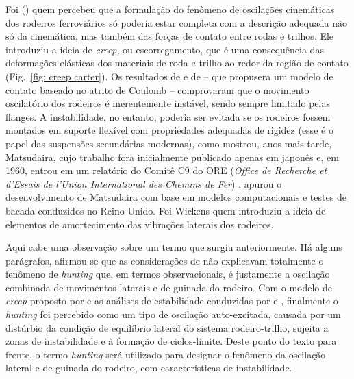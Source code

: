 Foi \citeauthor{carter_electric_1916} (\citeyear{carter_electric_1916,carter_action_1926}) quem percebeu que a formulação do fenômeno de 
oscilações cinemáticas dos rodeiros ferroviários só poderia
estar completa com a descrição adequada não só da cinemática, mas também das forças de contato entre rodas e trilhos. Ele introduziu a ideia de 
\textit{creep}, ou escorregamento, que é uma consequência das deformações elásticas dos materiais de roda e trilho ao redor da região de 
contato (Fig.~\ref{fig: creep carter}). 
Os resultados de \citeauthor{carter_electric_1916} e de  -- que propusera um modelo
de contato baseado no atrito de Coulomb -- comprovaram que o movimento oscilatório dos rodeiros é inerentemente instável, sendo sempre limitado pelas flanges.
A instabilidade, no entanto, poderia ser evitada se os rodeiros fossem montados em suporte flexível com propriedades adequadas de rigidez (esse é
o papel das suspensões secundárias modernas), como mostrou, anos mais tarde, Matsudaira, cujo trabalho fora inicialmente publicado apenas em japonês
e, em 1960, entrou em um relatório do Comitê C9 do ORE (\textit{Office de Recherche et d'Essais de l'Union International des Chemins de Fer}) . 
 apurou o desenvolvimento de Matsudaira com base em modelos computacionais e testes
de bacada conduzidos no Reino Unido. Foi Wickens quem introduziu a ideia de elementos de amortecimento das vibrações laterais dos rodeiros.

Aqui cabe uma observação sobre um termo que surgiu anteriormente. Há alguns parágrafos, afirmou-se que as considerações de \citeauthor{redtenbacher_gesetze_1855}
não explicavam totalmente o fenômeno de \textit{hunting} que, em termos observacionais, é justamente a oscilação
combinada de movimentos laterais e de guinada do rodeiro. Com o modelo de \textit{creep} proposto por \citeauthor{carter_electric_1916}
e as análises de estabilidade conduzidas por \citeauthor{matsudaira_shimmy_1952} e \citeauthor{wickens_dynamics_1965}, finalmente o \textit{hunting}
foi percebido como um tipo de oscilação auto-excitada, causada por um distúrbio da condição de equilíbrio lateral do sistema 
rodeiro-trilho, sujeita a zonas de instabilidade e à formação de ciclos-limite. Deste ponto do texto para frente, o termo \textit{hunting}
será utilizado para designar o fenômeno da oscilação lateral e de guinada do rodeiro, com características de instabilidade.
 
